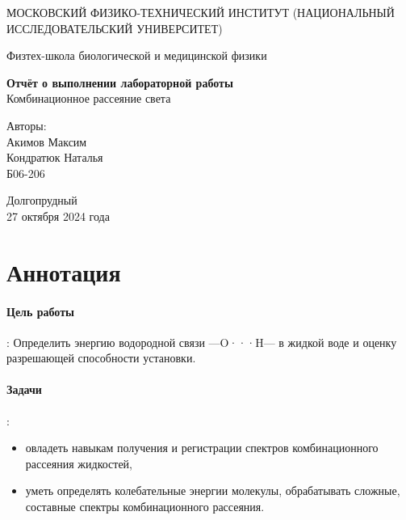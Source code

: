 \documentclass{article}
\begin{document}
\begin{titlepage}
	\begin{center}
		{\large МОСКОВСКИЙ ФИЗИКО-ТЕХНИЧЕСКИЙ ИНСТИТУТ (НАЦИОНАЛЬНЫЙ ИССЛЕДОВАТЕЛЬСКИЙ УНИВЕРСИТЕТ)}
	\end{center}
	\begin{center}
		{\large Физтех-школа биологической и медицинской физики}
	\end{center}
	
	
	\vspace{4.5cm}
	{\huge
		\begin{center}
			{\bf Отчёт о выполнении лабораторной работы}\\
			Комбинационное рассеяние света
		\end{center}
	}
	\vspace{3cm}
	\begin{flushright}
		{\LARGE Авторы:\\ Акимов Максим \\ Кондратюк Наталья \\
			\vspace{0.5cm}
			Б06-206}
	\end{flushright}
	\vspace{3cm}
	\begin{center}
		Долгопрудный 
       \\27 октября 2024 года
	\end{center}
 
\end{titlepage}

\newpage 
\section{Аннотация}
\paragraph*{Цель работы}: Определить энергию
водородной связи —O···H— в жидкой воде и оценку разрешающей способности установки. 
\paragraph*{Задачи}:
\begin{itemize}
\item овладеть навыкам получения и регистрации спектров комбинационного рассеяния жидкостей, 
\item уметь определять колебательные энергии молекулы, обрабатывать сложные, составные спектры комбинационного рассеяния.
\end{itemize}
\end{document}
